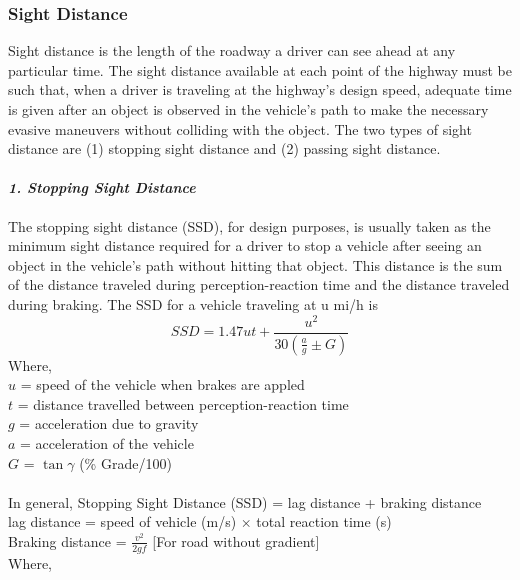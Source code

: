 \subsubsection{Sight Distance}
Sight distance is the length of the roadway a driver can see ahead at any particular time. The sight distance available at each point of the highway must be such that, when a driver is traveling at the highway’s design speed, adequate time is given after an object is observed in the vehicle’s path to make the necessary evasive maneuvers without colliding with the object. The two types of sight distance are (1) stopping sight distance and (2) passing sight distance.
\paragraph{\emph{1. Stopping Sight Distance}}
The stopping sight distance (SSD), for design purposes, is usually taken as the minimum sight distance required for a driver to stop a vehicle after seeing an object in the vehicle’s path without hitting that object. This distance is the sum of the distance traveled during perception-reaction time and the distance traveled during braking. The SSD for a vehicle traveling at u mi/h is
\begin{equation}
	SSD = 1.47ut + \frac{u^2}{30\left(\frac{a}{g} \pm G \right)}
\end{equation}
Where,\\
\hspace*{10mm}$u$ = speed of the vehicle when brakes are appled\\
\hspace*{10mm}$t$ = distance travelled between perception-reaction time\\
\hspace*{10mm}$g$ = acceleration due to gravity\\
\hspace*{10mm}$a$ = acceleration of the vehicle\\
\hspace*{10mm}$G$ = $\tan \gamma$ (\% Grade/100)\\\\
In general, Stopping Sight Distance (SSD) = lag distance + braking distance\\
lag distance = speed of vehicle (m/s) $ \times $ total reaction time (s)\\
Braking distance = $ \frac{v^2}{2gf} $ [For road without gradient]\\
Where,\\
